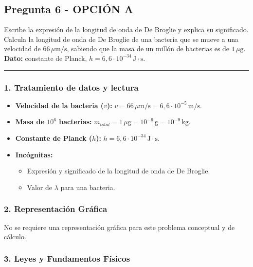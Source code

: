 \subsection{Pregunta 6 - OPCIÓN A}
\label{subsec:6A_2019_jul_ext}

\begin{cajaenunciado}
Escribe la expresión de la longitud de onda de De Broglie y explica su significado. Calcula la longitud de onda de De Broglie de una bacteria que se mueve a una velocidad de $66\,\mu\text{m/s}$, sabiendo que la masa de un millón de bacterias es de $1\,\mu\text{g}$.
\textbf{Dato:} constante de Planck, $h=6,6\cdot10^{-34}\,\text{J}\cdot\text{s}$.
\end{cajaenunciado}
\hrule

\subsubsection*{1. Tratamiento de datos y lectura}
\begin{itemize}
    \item \textbf{Velocidad de la bacteria ($v$):} $v = 66\,\mu\text{m/s} = 6,6 \cdot 10^{-5}\,\text{m/s}$.
    \item \textbf{Masa de $10^6$ bacterias:} $m_{total} = 1\,\mu\text{g} = 10^{-6}\,\text{g} = 10^{-9}\,\text{kg}$.
    \item \textbf{Constante de Planck ($h$):} $h = 6,6 \cdot 10^{-34}\,\text{J}\cdot\text{s}$.
    \item \textbf{Incógnitas:}
    \begin{itemize}
        \item Expresión y significado de la longitud de onda de De Broglie.
        \item Valor de $\lambda$ para una bacteria.
    \end{itemize}
\end{itemize}

\subsubsection*{2. Representación Gráfica}
No se requiere una representación gráfica para este problema conceptual y de cálculo.

\subsubsection*{3. Leyes y Fundamentos Físicos}
